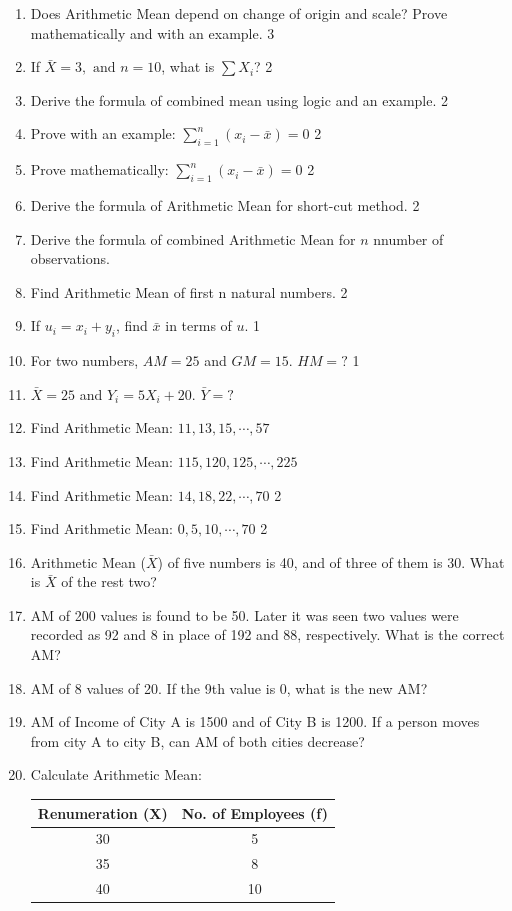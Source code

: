 \documentclass[a4paper,oneside]{book}
\begin{document}
\begin{enumerate}
    \item Does Arithmetic Mean depend on change of origin and 
    scale? Prove mathematically and with an example. \hfill 3
    \item If $\bar{X} = 3 , \text{ and } n = 10$, what is $\sum X_i$? \hfill 2
    \item Derive the formula of combined mean using logic and an example. \hfill 2
    \item Prove with an example: $\displaystyle \sum_{i=1}^n (x_i-\bar x) = 0$ \hfill 2
    \item Prove mathematically: $\displaystyle \sum_{i=1}^n (x_i-\bar x) = 0$ \hfill 2
    \item Derive the formula of Arithmetic Mean for short-cut method. \hfill 2
    \item Derive the formula of combined Arithmetic Mean for $n$ nnumber of observations.
    \item Find Arithmetic Mean of first n natural numbers. \hfill 2
    \item If $u_i = x_i + y_i$, find $\bar x$ in terms of $u$. \hfill 1
    \item For two numbers, $AM=25$ and $GM=15$. $HM=?$ \hfill 1
    \item $\bar X = 25$ and $Y_i = 5X_i + 20$. $\bar Y = ?$
    \item Find Arithmetic Mean: $11,13,15, \cdots, 57$
    \item Find Arithmetic Mean: $115,120,125, \cdots, 225$
    \item Find Arithmetic Mean: $14,18,22, \cdots, 70$ \hfill 2
    \item Find Arithmetic Mean: $0, 5, 10, \cdots, 70$ \hfill 2
    \item Arithmetic Mean ($\bar X$) of five numbers is 40, and of three of them is 30. What is $\bar X$ of the rest two?
    \item AM of 200 values is found to be 50. Later it was seen two values were recorded as 92 and 8 in place of 192 and 88, respectively. What is the correct AM?
    \item AM of 8 values of 20. If the 9th value is 0, what is the new AM?
    \item AM of Income of City A is 1500 and of City B is 1200. If a person moves from city A to city B, can AM of both cities decrease?
    \item Calculate Arithmetic Mean:
    
    \begin{table}[h]
    \centering
\begin{tabular}{c|c}
\textbf{Renumeration (X)} & \textbf{No. of Employees (f)} \\ \hline
30               & 5                    \\ \hline
35               & 8                    \\ \hline
40               & 10                  
\end{tabular}
\end{table}
    

\end{enumerate}
\end{document}
